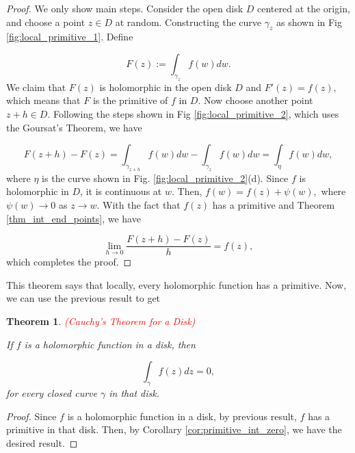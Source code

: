 \documentclass{article}
\newtheorem{theorem}{Theorem}
\begin{document}
\begin{proof}
We only show main steps. Consider the open disk $D$ centered at the origin, and choose a point $z\in D$ at random. Constructing the curve $\gamma_z$ as shown in Fig \ref{fig:local_primitive_1}. Define

\begin{equation*}
F(z):=\int_{\gamma_z}f(w)dw.
\end{equation*}
We claim that $F(z)$ is holomorphic in the open disk $D$ and $F'(z)=f(z)$, which means that $F$ is the primitive of $f$ in $D$. Now choose another point $z+h\in D$. Following the steps shown in Fig \ref{fig:local_primitive_2}, which uses the Goursat's Theorem, we have

\begin{equation*}
F(z+h)-F(z)=\int_{\gamma_{z+h}}f(w)dw-\int_{\gamma_{z}}f(w)dw=\int_\eta f(w)dw,
\end{equation*}
where $\eta$ is the curve shown in Fig. \ref{fig:local_primitive_2}(d). Since $f$ is holomorphic in $D$, it is continuous at $w$. Then, $f(w)=f(z)+\psi(w),$ where $\psi(w)\rightarrow0$ as $z\rightarrow w$. With the fact that $f(z)$ has a primitive and Theorem \ref{thm_int_end_points}, we have

\begin{equation*}
\lim_{h\rightarrow0}\frac{F(z+h)-F(z)}{h}=f(z),
\end{equation*}
which completes the proof.
\end{proof}

This theorem says that locally, every holomorphic function has a primitive. Now, we can use the previous result to get 

\begin{theorem} \label{thm:cauchy} \textcolor{red}{(Cauchy's Theorem for a Disk)}

If $f$ is a holomorphic function in a disk, then 

\begin{equation}
\int_\gamma f(z)dz=0,
\end{equation}
for every closed curve $\gamma$ in that disk.

\end{theorem}

\begin{proof}
Since $f$ is a holomorphic function in a disk, by previous result, $f$ has a primitive in that disk. Then, by Corollary \ref{cor:primitive_int_zero}, we have the desired result.
\end{proof}
\end{document}

